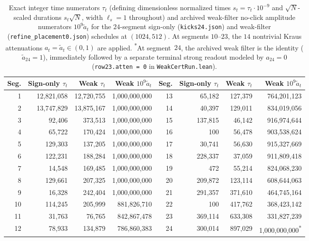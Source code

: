 \documentclass[11pt,a4paper]{article}
\theoremstyle{definition}
\theoremstyle{remark}
\begin{document}
\begin{table}[htbp]
\centering\small
\setlength{\tabcolsep}{4pt}
\begin{tabular}{@{}rrrr@{\qquad}rrrr@{}}
\toprule
Seg. & Sign-only \(\tau_t\) & Weak \(\tau_t\) & Weak \(10^9 \widetilde{a}_t\) &
Seg. & Sign-only \(\tau_t\) & Weak \(\tau_t\) & Weak \(10^9 \widetilde{a}_t\) \\
\midrule
1  & 12{,}821{,}058 & 12{,}720{,}755 & 1{,}000{,}000{,}000 & 13 &    65{,}182 &   127{,}379 &   764{,}201{,}123 \\
2  & 13{,}747{,}829 & 13{,}875{,}167 & 1{,}000{,}000{,}000 & 14 &    40{,}397 &   129{,}011 &   834{,}019{,}056 \\
3  &     92{,}406 &    373{,}513 & 1{,}000{,}000{,}000 & 15 &   137{,}815 &    46{,}142 &   916{,}974{,}644 \\
4  &     65{,}722 &    170{,}424 & 1{,}000{,}000{,}000 & 16 &        100 &    56{,}478 &   903{,}538{,}624 \\
5  &    129{,}303 &    137{,}205 & 1{,}000{,}000{,}000 & 17 &    30{,}741 &    56{,}630 &   915{,}327{,}669 \\
6  &    122{,}231 &    188{,}284 & 1{,}000{,}000{,}000 & 18 &   228{,}337 &    37{,}059 &   911{,}809{,}418 \\
7  &     14{,}548 &    169{,}485 & 1{,}000{,}000{,}000 & 19 &        472 &    55{,}214 &   824{,}068{,}230 \\
8  &    129{,}661 &    207{,}325 & 1{,}000{,}000{,}000 & 20 &   209{,}872 &   123{,}114 &   608{,}644{,}063 \\
9  &     16{,}328 &    242{,}404 & 1{,}000{,}000{,}000 & 21 &   291{,}357 &   371{,}610 &   464{,}745{,}164 \\
10 &    114{,}245 &    205{,}999 &   881{,}826{,}710 & 22 &        100 &   417{,}762 &   368{,}423{,}142 \\
11 &     31{,}763 &     76{,}765 &   842{,}867{,}478 & 23 &   369{,}114 &   633{,}308 &   331{,}827{,}239 \\
12 &     78{,}933 &    134{,}879 &   786{,}860{,}383 & 24 &   300{,}014 &   897{,}029 & 1{,}000{,}000{,}000\textsuperscript{*} \\
\bottomrule
\end{tabular}
\caption{Exact integer time numerators \(\tau_t\) (defining dimensionless normalized times \(s_t = \tau_t \cdot 10^{-9}\) and \(\sqrt{N}\)-scaled durations \(s_t\sqrt{N}\), width \(\ell_s = 1\) throughout) and archived weak-filter no-click amplitude numerators \(10^9 \widetilde{a}_t\) for the \(24\)-segment sign-only (\texttt{kicks24.json}) and weak-filter (\texttt{refine\_placement0.json}) schedules at \((1024,512)\). At segments \(10\text{--}23\), the \(14\) nontrivial Kraus attenuations \(a_t = \widetilde{a}_t \in (0, 1)\) are applied. \textsuperscript{*}At segment~\(24\), the archived weak filter is the identity (\(\widetilde{a}_{24} = 1\)), immediately followed by a separate terminal strong readout modeled by \(a_{24} = 0\) (\texttt{row23.atten = 0} in \texttt{WeakCertRun.lean}).}
\label{tab:schedules}
\end{table}
\end{document}
